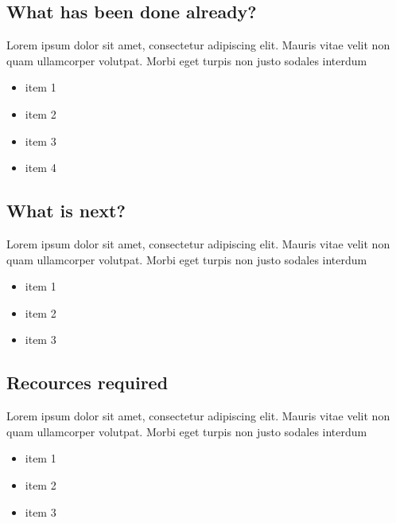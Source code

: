\documentclass[11pt,a4paper,titlepage]{article}
\begin{document}
\subsection{What has been done already?}
Lorem ipsum dolor sit amet, consectetur adipiscing elit. Mauris vitae velit 
non quam ullamcorper volutpat. Morbi eget turpis non justo sodales interdum
\newline
\begin{itemize}
\item item 1
\item item 2
\item item 3
\item item 4
\end{itemize}

\subsection{What is next?}
Lorem ipsum dolor sit amet, consectetur adipiscing elit. Mauris vitae velit 
non quam ullamcorper volutpat. Morbi eget turpis non justo sodales interdum
\newline
\begin{itemize}
\item item 1
\item item 2
\item item 3
\end{itemize}
 
\subsection{Recources required}
Lorem ipsum dolor sit amet, consectetur adipiscing elit. Mauris vitae velit 
non quam ullamcorper volutpat. Morbi eget turpis non justo sodales interdum
\newline
\begin{itemize}
\item item 1
\item item 2
\item item 3
\end{itemize}
\end{document}

